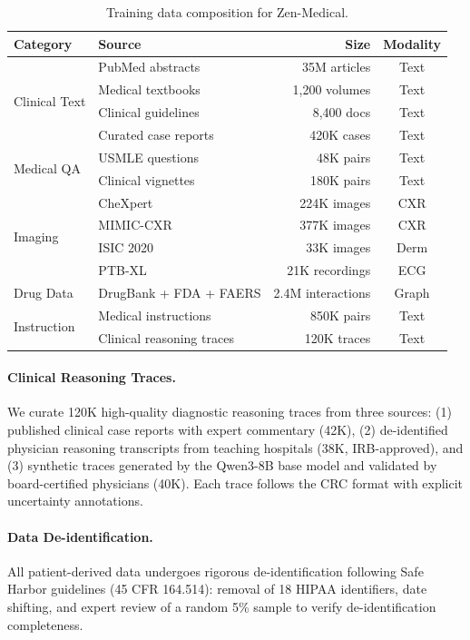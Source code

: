 \documentclass[11pt,a4paper]{article}
\begin{document}
\begin{table}[t]
\centering
\caption{Training data composition for Zen-Medical.}
\label{tab:data}
\begin{tabular}{llrc}
\toprule
\textbf{Category} & \textbf{Source} & \textbf{Size} & \textbf{Modality} \\
\midrule
\multirow{4}{*}{Clinical Text} & PubMed abstracts & 35M articles & Text \\
& Medical textbooks & 1,200 volumes & Text \\
& Clinical guidelines & 8,400 docs & Text \\
& Curated case reports & 420K cases & Text \\
\midrule
\multirow{2}{*}{Medical QA} & USMLE questions & 48K pairs & Text \\
& Clinical vignettes & 180K pairs & Text \\
\midrule
\multirow{4}{*}{Imaging} & CheXpert & 224K images & CXR \\
& MIMIC-CXR & 377K images & CXR \\
& ISIC 2020 & 33K images & Derm \\
& PTB-XL & 21K recordings & ECG \\
\midrule
Drug Data & DrugBank + FDA + FAERS & 2.4M interactions & Graph \\
\midrule
\multirow{2}{*}{Instruction} & Medical instructions & 850K pairs & Text \\
& Clinical reasoning traces & 120K traces & Text \\
\bottomrule
\end{tabular}
\end{table}

\paragraph{Clinical Reasoning Traces.} We curate 120K high-quality diagnostic reasoning traces from three sources: (1) published clinical case reports with expert commentary (42K), (2) de-identified physician reasoning transcripts from teaching hospitals (38K, IRB-approved), and (3) synthetic traces generated by the Qwen3-8B base model and validated by board-certified physicians (40K). Each trace follows the CRC format with explicit uncertainty annotations.

\paragraph{Data De-identification.} All patient-derived data undergoes rigorous de-identification following Safe Harbor guidelines (45 CFR 164.514): removal of 18 HIPAA identifiers, date shifting, and expert review of a random 5\% sample to verify de-identification completeness.
\end{document}
